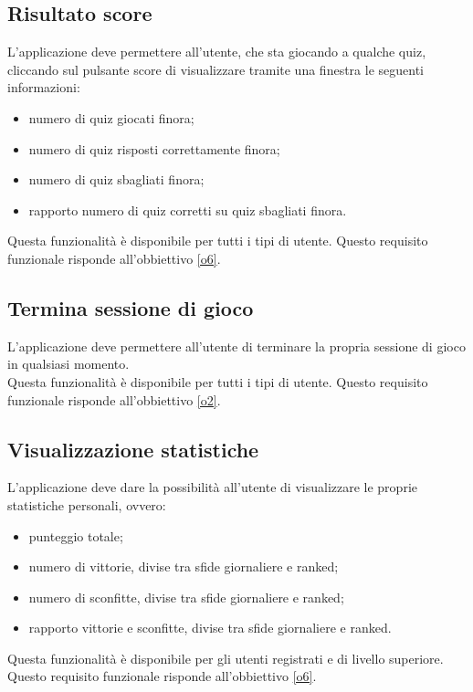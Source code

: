  \subsection{Risultato score} \label{req_risultato_score}
L'applicazione deve permettere all'utente, che sta giocando a qualche quiz, cliccando sul pulsante score di visualizzare tramite una finestra le seguenti informazioni: 
\begin{itemize}
    \item numero di quiz giocati finora;
    \item numero di quiz risposti correttamente finora;
    \item numero di quiz sbagliati finora;
    \item rapporto numero di quiz corretti su quiz sbagliati finora.
\end{itemize}
Questa funzionalità è disponibile per tutti i tipi di utente. Questo requisito funzionale risponde all'obbiettivo \ref{o6}.
 
 \subsection{Termina sessione di gioco} \label{req_termina_sessione_di_gioco}
L'applicazione deve permettere all'utente di terminare la propria sessione di gioco in qualsiasi momento. \\
Questa funzionalità è disponibile per tutti i tipi di utente.
Questo requisito funzionale risponde all'obbiettivo \ref{o2}.

\subsection{Visualizzazione statistiche} \label{req_visualizza_statistica}
 L'applicazione deve dare la possibilità all'utente di visualizzare  le proprie statistiche personali, ovvero:
\begin{itemize}
    \item punteggio totale;
    \item numero di vittorie, divise tra sfide giornaliere e ranked;
    \item numero di sconfitte, divise tra sfide giornaliere e ranked;
    \item rapporto vittorie e sconfitte, divise tra sfide giornaliere e ranked.
\end{itemize}
Questa funzionalità è disponibile per gli utenti registrati e di livello superiore. Questo requisito funzionale risponde all'obbiettivo \ref{o6}.

